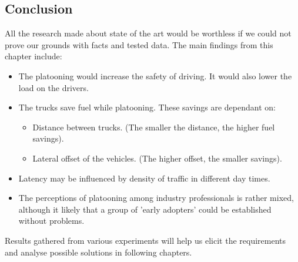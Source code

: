 \subsection{Conclusion}
All the research made about state of the art would be worthless if we could not prove our grounds with facts and tested data. The main findings from this chapter include:
% 
\begin{itemize}[noitemsep]
    \item The platooning would increase the safety of driving. It would also lower the load on the drivers.
    \item The trucks save fuel while platooning. These savings are dependant on:
    \begin{itemize}[noitemsep,nolistsep]
        \item Distance between trucks. (The smaller the distance, the higher fuel savings).
        \item Lateral offset of the vehicles. (The higher offset, the smaller savings).
    \end{itemize}
    \item Latency may be influenced by density of traffic in different day times.
    \item The perceptions of platooning among industry professionals is rather mixed, although it likely that a group of 'early adopters' could be established without problems.
\end{itemize}
% 
Results gathered from various experiments will help us elicit the requirements and analyse possible solutions in following chapters.